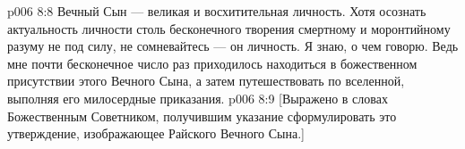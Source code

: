 \vs p006 8:8 \pc Вечный Сын --- великая и восхитительная личность. Хотя осознать актуальность личности столь бесконечного творения смертному и моронтийному разуму не под силу, не сомневайтесь --- он личность. Я знаю, о чем говорю. Ведь мне почти бесконечное число раз приходилось находиться в божественном присутствии этого Вечного Сына, а затем путешествовать по вселенной, выполняя его милосердные приказания.
\vsetoff
\vs p006 8:9 [Выражено в словах Божественным Советником, получившим указание сформулировать это утверждение, изображающее Райского Вечного Сына.]
